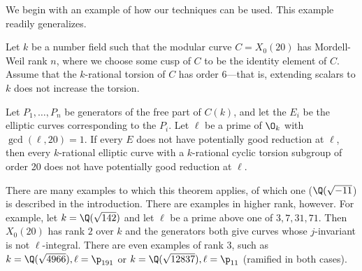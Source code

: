\documentclass[12pt]{amsart}
\begin{document}
We begin with an example of how our techniques can be used.  This example readily generalizes.

\begin{thm}\label{rankone}
	Let $k$ be a number field such that the modular curve $C=X_0(20)$ has Mordell-Weil rank $n$, where we choose some cusp of $C$ to be the identity element of $C$.  Assume that the $k$-rational torsion of $C$ has order $6$---that is, extending scalars to $k$ does not increase the torsion.
	
	Let $P_1, \dots, P_n$ be generators of the free part of $C(k)$, and let the $E_i$ be the elliptic curves corresponding to the $P_i$.  Let $\ell$ be a prime of $\O_k$ with $\gcd(\ell,20)=1$.  If every $E$ does not have potentially good reduction at $\ell$, then every $k$-rational elliptic curve with a $k$-rational cyclic torsion subgroup of order 20 does not have potentially good reduction at $\ell$.
\end{thm}

There are many examples to which this theorem applies, of which one ($\Q(\sqrt{-11}$) is described in the introduction.  There are examples in higher rank, however.  For example, let $k = \Q(\sqrt{142})$ and let $\ell$ be a prime above one of $3, 7, 31, 71$.  Then $X_0(20)$ has rank $2$ over $k$ and the generators both give curves whose $j$-invariant is not $\ell$-integral.  There are even examples of rank $3$,  such as $k = \Q(\sqrt{4966}), \ell = \p_{191}$ or $k = \Q(\sqrt{12837}), \ell = \p_{11}$ (ramified in both cases).
\end{document}
